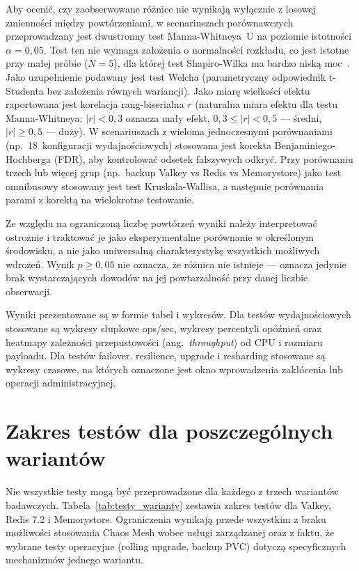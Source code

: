 Aby ocenić, czy zaobserwowane różnice nie wynikają wyłącznie z losowej zmienności między powtórzeniami, w scenariuszach porównawczych przeprowadzany jest dwustronny test Manna-Whitneya~U na poziomie istotności $\alpha = 0{,}05$. Test ten nie wymaga założenia o normalności rozkładu, co jest istotne przy małej próbie ($N = 5$), dla której test Shapiro-Wilka ma bardzo niską moc~\cite{shapiro1965}. Jako uzupełnienie podawany jest test Welcha (parametryczny odpowiednik t-Studenta bez założenia równych wariancji). Jako miarę wielkości efektu raportowana jest korelacja rang-biserialna $r$ (naturalna miara efektu dla testu Manna-Whitneya; $|r| < 0{,}3$ oznacza mały efekt, $0{,}3 \leq |r| < 0{,}5$ --- średni, $|r| \geq 0{,}5$ --- duży). W scenariuszach z wieloma jednoczesnymi porównaniami (np.~18~konfiguracji wydajnościowych) stosowana jest korekta Benjaminiego-Hochberga (FDR), aby kontrolować odsetek fałszywych odkryć. Przy porównaniu trzech lub więcej grup (np.~backup Valkey vs Redis vs Memorystore) jako test omnibusowy stosowany jest test Kruskala-Wallisa, a następnie porównania parami z korektą na wielokrotne testowanie.

Ze względu na ograniczoną liczbę powtórzeń wyniki należy interpretować ostrożnie i traktować je jako eksperymentalne porównanie w określonym środowisku, a nie jako uniwersalną charakterystykę wszystkich możliwych wdrożeń. Wynik $p \geq 0{,}05$ nie oznacza, że różnica nie istnieje --- oznacza jedynie brak wystarczających dowodów na jej powtarzalność przy danej liczbie obserwacji.

Wyniki prezentowane są w formie tabel i wykresów. Dla testów wydajnościowych stosowane są wykresy słupkowe ops/sec, wykresy percentyli opóźnień oraz heatmapy zależności przepustowości (ang.~\textit{throughput}) od CPU i rozmiaru payloadu. Dla testów failover, resilience, upgrade i resharding stosowane są wykresy czasowe, na których oznaczone jest okno wprowadzenia zakłócenia lub operacji administracyjnej.

\section{Zakres testów dla poszczególnych wariantów}

Nie wszystkie testy mogą być przeprowadzone dla każdego z trzech wariantów badawczych. Tabela~\ref{tab:testy_warianty} zestawia zakres testów dla Valkey, Redis 7.2 i Memorystore. Ograniczenia wynikają przede wszystkim z braku możliwości stosowania Chaos Mesh wobec usługi zarządzanej oraz z faktu, że wybrane testy operacyjne (rolling upgrade, backup PVC) dotyczą specyficznych mechanizmów jednego wariantu.


